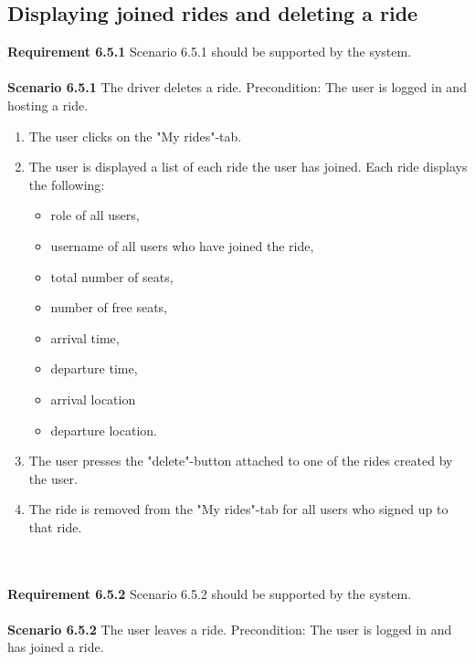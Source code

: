 \documentclass{article}
\begin{document}
\subsection{Displaying joined rides and deleting a ride}
\textbf{Requirement 6.5.1} Scenario 6.5.1 should be supported by the system.
\\ \\
\textbf{Scenario 6.5.1} The driver deletes a ride. Precondition: The user is logged in and hosting a ride.
\begin{enumerate}
    \item The user clicks on the "My rides"-tab.
    \item The user is displayed a list of each ride the user has joined. Each ride displays the following:
            \begin{itemize}
            \item role of all users,
            \item username of all users who have joined the ride,
            \item total number of seats,
            \item number of free seats,
            \item arrival time,
            \item departure time,
            \item arrival location
            \item departure location.
        \end{itemize}       
    \item The user presses the "delete"-button attached to one of the rides created by the user.
    \item The ride is removed from the "My rides"-tab for all users who signed up to that ride. 
\end{enumerate} 
\mbox{}\\ \\
\textbf{Requirement 6.5.2} Scenario 6.5.2 should be supported by the system.
\\ \\
\textbf{Scenario 6.5.2} The user leaves a ride. Precondition: The user is logged in and has joined a ride.
\end{document}
